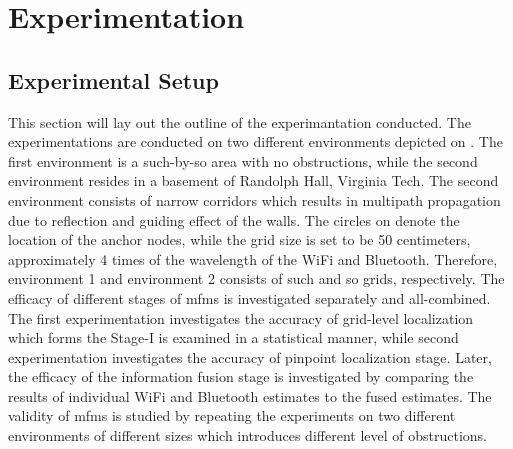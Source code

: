 \section{Experimentation}
\label{sec:experimentation}
    \subsection{Experimental Setup}
    This section will lay out the outline of the experimantation conducted.
    The experimentations are conducted on two different environments depicted on .
    The first environment is a such-by-so area with no obstructions, while the second environment resides in a basement of Randolph Hall, Virginia Tech.
    The second environment consists of narrow corridors which results in multipath propagation due to reflection and guiding effect of the walls.
    The circles on  denote the location of the anchor nodes, while the grid size is set to be 50 centimeters, approximately 4 times of the wavelength of the WiFi and Bluetooth.
    Therefore, environment 1 and environment 2 consists of such and so grids, respectively.
    The efficacy of different stages of \gls{mfms} is investigated separately and all-combined.
    The first experimentation investigates the accuracy of grid-level localization which forms the Stage-I is examined in a statistical manner, while second experimentation investigates the accuracy of pinpoint localization stage.
    Later, the efficacy of the information fusion stage is investigated by comparing the results of individual WiFi and Bluetooth estimates to the fused estimates.
    The validity of \gls{mfms} is studied by repeating the experiments on two different environments of different sizes which introduces different level of obstructions.


